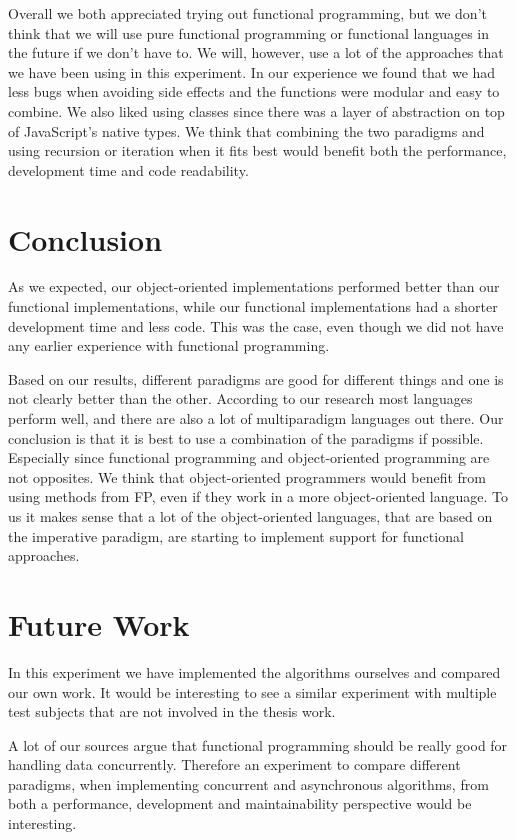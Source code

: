 \documentclass {article}
\begin{document}
Overall we both appreciated trying out functional programming, but we don't think that we will use pure functional programming or functional languages in the future if we don't have to. We will, however, use a lot of the approaches that we have been using in this experiment. In our experience we found that we had less bugs when avoiding side effects and the functions were modular and easy to combine. We also liked using classes since there was a layer of abstraction on top of JavaScript's native types. We think that combining the two paradigms and using recursion or iteration when it fits best would benefit both the performance, development time and code readability. 
\section{Conclusion}
As we expected, our object-oriented implementations performed better than our functional implementations, while our functional implementations had a shorter development time and less code. This was the case, even though we did not have any earlier experience with functional programming.  

Based on our results, different paradigms are good for different things and one is not clearly better than the other. According to our research most languages perform well, and there are also a lot of multiparadigm languages out there. Our conclusion is that it is best to use a combination of the paradigms if possible. Especially since functional programming and object-oriented programming are not opposites. We think that object-oriented programmers would benefit from using methods from FP, even if they work in a more object-oriented language. To us it makes sense that a lot of the object-oriented languages, that are based on the imperative paradigm, are starting to implement support for functional approaches.

\section{Future Work}
In this experiment we have implemented the algorithms ourselves and compared our own work. It would be interesting to see a similar experiment with multiple test subjects that are not involved in the thesis work. 

A lot of our sources argue that functional programming should be really good for handling data concurrently. Therefore an experiment to compare different paradigms,  when implementing concurrent and asynchronous algorithms, from both a performance, development and maintainability perspective would be interesting. 
\end{document}
